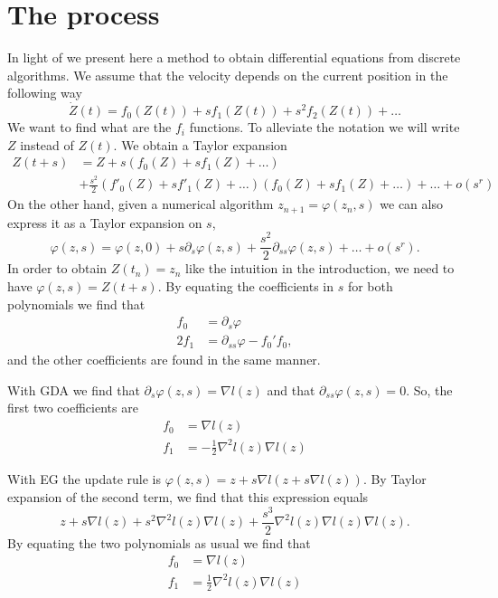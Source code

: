 \documentclass[main.tex]{subfiles}
\begin{document}
\section{The process}
In light of \cite{luResolutionODEFramework2021} we present here a method to
obtain differential equations from discrete algorithms. We assume that the
velocity depends on the current position in the following way
\[ \dot Z(t) = f_0(Z(t)) + sf_1(Z(t)) + s^2f_2(Z(t)) + \dots \]
We want to find what are the $f_i$ functions.
To alleviate the notation we will write $Z$ instead of $Z(t)$.
We obtain a Taylor expansion
\begin{align*}
	Z(t + s) & = Z + s(f_0(Z) + sf_1(Z) + \dots)                                                      \\
	         & + \frac{s^2}{2}(f'_0(Z) + sf'_1(Z) + \dots)(f_0(Z) + sf_1(Z) + \dots) + \dots + o(s^r)
\end{align*}\label{eq:taylor-x}
On the other hand, given a numerical algorithm $z_{n+1} = \varphi(z_n, s)$
we can also express it as a Taylor expansion on $s$,
\[\varphi(z, s) = \varphi(z, 0) + s \partial_s \varphi(z, s) + \frac{s^2}{2} \partial_{ss} \varphi(z, s) + \dots + o(s^r) .\]
In order to obtain $Z(t_n) = z_n$ like the intuition in the introduction, we
need to have $\varphi(z,s) = Z(t+s)$.
By equating the coefficients in $s$ for both polynomials we find that
\begin{align*}
	f_0   & = \partial_s \varphi                \\
	2 f_1 & = \partial_{ss} \varphi - f_0' f_0,
\end{align*}
and the other coefficients are found in the same manner.

\begin{ex}
	With GDA we find that $\partial_s \varphi(z,s) = \nabla l(z)$ and that $\partial_{ss} \varphi(z,s) = 0$.
	So, the first two coefficients are \begin{align*}
		f_0 & = \nabla l(z)                            \\
		f_1 & = - \frac{1}{2}\nabla^2 l(z) \nabla l(z)
	\end{align*}
\end{ex}

\begin{ex}
	With EG the update rule is $\varphi(z,s) = z + s\nabla l(z + s\nabla
		l(z)).$ By Taylor expansion of the second term, we find that this
	expression equals
	\[z + s \nabla l(z) + s^2 \nabla^2 l(z) \nabla l(z) + \frac{s^3}{2}
		\nabla^2 l(z) \nabla l(z) \nabla l(z).\]
	By equating the two polynomials as usual we find that \begin{align*}
		f_0 & =  \nabla l(z)                         \\
		f_1 & = \frac{1}{2}\nabla^2 l(z) \nabla l(z)
	\end{align*}
\end{ex}
\end{document}
